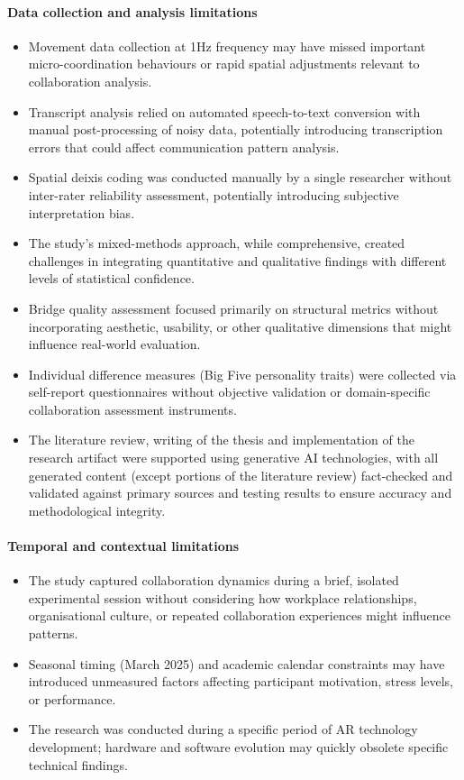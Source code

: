 \paragraph{Data collection and analysis limitations}
\begin{itemize}
    \item Movement data collection at 1Hz frequency may have missed important micro-coordination behaviours or rapid spatial adjustments relevant to collaboration analysis.
    \item Transcript analysis relied on automated speech-to-text conversion with manual post-processing of noisy data, potentially introducing transcription errors that could affect communication pattern analysis.
    \item Spatial deixis coding was conducted manually by a single researcher without inter-rater reliability assessment, potentially introducing subjective interpretation bias.
    \item The study's mixed-methods approach, while comprehensive, created challenges in integrating quantitative and qualitative findings with different levels of statistical confidence.
    \item Bridge quality assessment focused primarily on structural metrics without incorporating aesthetic, usability, or other qualitative dimensions that might influence real-world evaluation.
    \item Individual difference measures (Big Five personality traits) were collected via self-report questionnaires without objective validation or domain-specific collaboration assessment instruments.
    \item The literature review, writing of the thesis and implementation of the research artifact were supported using generative AI technologies, with all generated content (except portions of the literature review) fact-checked and validated against primary sources and testing results to ensure accuracy and methodological integrity.
\end{itemize}

\paragraph{Temporal and contextual limitations}
\begin{itemize}
    \item The study captured collaboration dynamics during a brief, isolated experimental session without considering how workplace relationships, organisational culture, or repeated collaboration experiences might influence patterns.
    \item Seasonal timing (March 2025) and academic calendar constraints may have introduced unmeasured factors affecting participant motivation, stress levels, or performance.
    \item The research was conducted during a specific period of AR technology development; hardware and software evolution may quickly obsolete specific technical findings.
\end{itemize}



